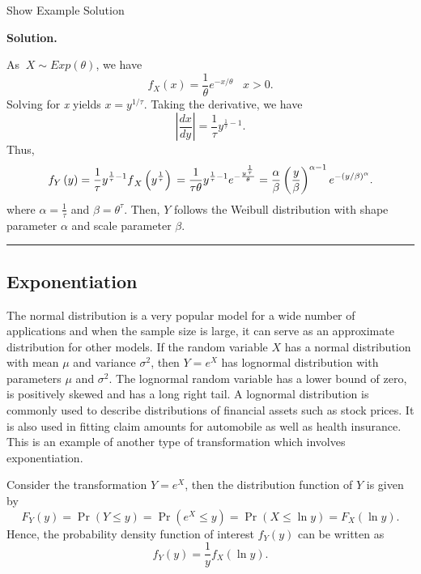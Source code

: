 \documentclass[]{book}
\theoremstyle{definition}
\theoremstyle{definition}
\theoremstyle{definition}
\theoremstyle{remark}
\begin{document}
Show Example Solution

\hypertarget{toggleExampleLoss.3.3}{}
\textbf{Solution.}

As \(\ X\sim Exp(\theta)\), we have
\[f_{X}(x) = \frac{1}{\theta}e^{- x/ \theta} \ \ \ \, x > 0.\] Solving
for \emph{x} yields \(x = y^{1/\tau}\). Taking the derivative, we have
\[\left| \frac{dx}{dy} \right| = \frac{1}{\tau}{y^{\frac{1}{\tau}-1}}.\]
Thus,
\[f_{Y}\left( y \right) = \frac{1}{\tau}{y^{\frac{1}{\tau} - 1}f}_{X}\left( y^{\frac{1}{\tau}} \right) \\
= \frac{1}{\tau \theta }y^{\frac{1}{\tau} - 1}e^{- \frac{y^{\frac{1}{\tau}}}{\theta}} = \frac{\alpha}{\beta}\left( \frac{y}{\beta} \right)^{\alpha - 1}e^{- \left( y/ \beta \right)^{\alpha}}.\]
where \(\alpha = \frac{1}{\tau}\) and \(\beta = \theta^{\tau}\). Then,
\(Y\) follows the Weibull distribution with shape parameter \(\alpha\)
and scale parameter \(\beta\).

\begin{center}\rule{0.5\linewidth}{\linethickness}\end{center}

\subsection{Exponentiation}\label{exponentiation}

The normal distribution is a very popular model for a wide number of
applications and when the sample size is large, it can serve as an
approximate distribution for other models. If the random variable \(X\)
has a normal distribution with mean \(\mu\) and variance \(\sigma^{2}\),
then \(Y = e^{X}\) has lognormal distribution with parameters \(\mu\)
and \(\sigma^{2}\). The lognormal random variable has a lower bound of
zero, is positively skewed and has a long right tail. A lognormal
distribution is commonly used to describe distributions of financial
assets such as stock prices. It is also used in fitting claim amounts
for automobile as well as health insurance. This is an example of
another type of transformation which involves exponentiation.

Consider the transformation \(Y = e^{X}\), then the distribution
function of \(Y\) is given by
\[F_{Y}\left( y \right) = \Pr\left( Y \leq y \right) = \Pr\left( e^{X} \leq y \right) = \Pr\left( X \leq \ln y \right) = F_{X}\left( \ln y \right).\]
Hence, the probability density function of interest \(f_{Y}(y)\) can be
written as \[f_{Y}(y) = \frac{1}{y}f_{X}\left( \ln y \right).\]
\end{document}

